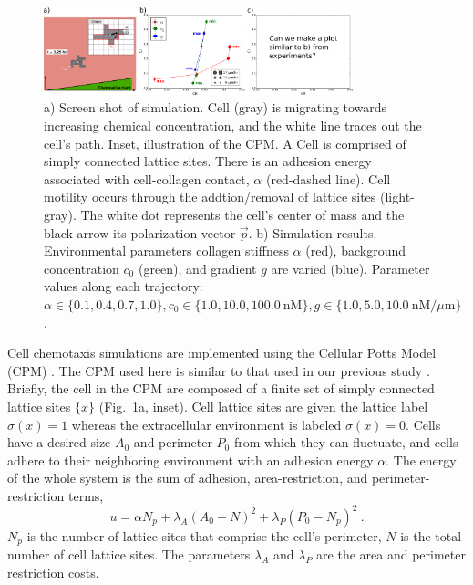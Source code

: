 \begin{figure}
    \centering
    \includegraphics[width=0.80\textwidth]{../fig/ch2_fig3.png}
    \caption{a) Screen shot of simulation. Cell (gray) is migrating towards increasing chemical concentration, and the white line traces out the cell's path. Inset, illustration of the CPM. A Cell is comprised of simply connected lattice sites. There is an adhesion energy associated with cell-collagen contact, $\alpha$ (red-dashed line). Cell motility occurs through the addtion/removal of lattice sites (light-gray). The white dot represents the cell's center of mass and the black arrow its polarization vector $\vec{p}$. b) Simulation results. Environmental parameters collagen stiffness $\alpha$ (red), background concentration $c_0$ (green), and gradient $g$ are varied (blue).
    Parameter values along each trajectory: $\alpha \in \{ 0.1, 0.4, 0.7, 1.0 \}, c_0 \in \{ 1.0, 10.0, 100.0 \ \text{nM} \}, g \in \{ 1.0, 5.0, 10.0 \ \text{nM}/\mu\text{m} \}$.}
    \label{fig:ch2_3}
\end{figure}

Cell chemotaxis simulations are implemented using the Cellular Potts Model (CPM) \cite{graner1992simulation,swat2012multi}. The CPM used here is similar to that used in our previous study \cite{varennes2016collective}.
Briefly, the cell in the CPM are composed of a finite set of simply connected lattice sites $\{ x \}$ (Fig.\ \ref{fig:ch2_3}a, inset).
Cell lattice sites are given the lattice label $\sigma(x)=1$ whereas the extracellular environment is labeled $\sigma(x)=0$. Cells have a desired size $A_0$ and perimeter $P_0$ from which they can fluctuate, and cells adhere to their neighboring environment with an adhesion energy $\alpha$. The energy of the whole system is the sum of adhesion, area-restriction, and perimeter-restriction terms,
\begin{equation} \label{eq:CPMu1}
    u = \alpha N_p + \lambda_A(A_0 - N)^2 + \lambda_P(P_0 - N_p)^2 \ .
\end{equation}
$N_p$ is the number of lattice sites that comprise the cell's perimeter, $N$ is the total number of cell lattice sites. The parameters $\lambda_{A}$ and $\lambda_{P}$ are the area and perimeter restriction costs.

